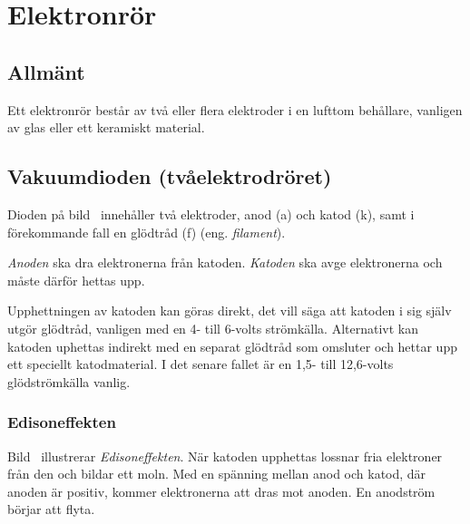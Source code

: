 \section{Elektronrör}
\label{sec:elektronror}

\subsection{Allmänt}

Ett elektronrör består av två eller flera elektroder i en lufttom behållare,
vanligen av glas eller ett keramiskt material.


\subsection{Vakuumdioden (tvåelektrodröret)}
\label{vakuumdioden}

Dioden på bild~ innehåller två elektroder, anod (a) och
katod (k), samt i förekommande fall en glödtråd (f) (eng. \emph{filament}).

\emph{Anoden} ska dra elektronerna från katoden.
\emph{Katoden} ska avge elektronerna och måste därför hettas upp.

Upphettningen av katoden kan göras direkt, det vill säga att katoden i sig
själv utgör glödtråd, vanligen med en 4- till 6-volts strömkälla.
Alternativt kan katoden uphettas indirekt med en separat glödtråd som omsluter
och hettar upp ett speciellt katodmaterial.
I det senare fallet är en 1,5- till 12,6-volts glödströmkälla vanlig.



\subsubsection{Edisoneffekten}

Bild~ illustrerar \emph{Edisoneffekten}.
När katoden upphettas lossnar fria elektroner från den och bildar ett moln.
Med en spänning mellan anod och katod, där anoden är positiv, kommer
elektronerna att dras mot anoden.
En anodström börjar att flyta.

